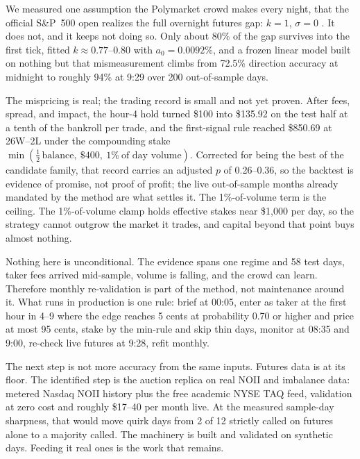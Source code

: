 \label{sec:conclusion}

We measured one assumption the Polymarket crowd makes every night, that the
official S\&P~500 open realizes the full overnight futures gap:
$k = 1$, $\sigma = 0$ \citep{polymarket2026spxmarket}. It does not, and
it keeps not doing so. Only about 80\% of the gap survives into the first
tick, fitted $k \approx 0.77$--$0.80$ with $a_0 = 0.0092\%$, and a frozen
linear model built on nothing but that mismeasurement climbs from 72.5\%
direction accuracy at midnight to roughly 94\% at 9:29 over 200
out-of-sample days.

The mispricing is real; the trading record is small and not yet proven.
After fees, spread, and impact, the
hour-4 hold turned \$100 into \$135.92 on the test half at a tenth of the
bankroll per trade, and the first-signal rule reached \$850.69 at 26W--2L
under the compounding stake $\min(\tfrac{1}{2}\,\text{balance},\ \$400,\
1\%\ \text{of day volume})$. Corrected for being the best of the candidate
family, that record carries an adjusted $p$ of 0.26--0.36, so the backtest
is evidence of promise, not proof of profit; the live out-of-sample months
already mandated by the method are what settles it. The
1\%-of-volume term is the ceiling. The
1\%-of-volume clamp holds effective stakes near \$1{,}000 per day, so the
strategy cannot outgrow the market it trades, and capital beyond that point
buys almost nothing.

Nothing here is unconditional. The evidence spans one regime and 58 test
days, taker fees arrived mid-sample, volume is falling, and the crowd can
learn. Therefore monthly re-validation is part of the method, not
maintenance around it. What runs in production is one rule: brief at 00:05,
enter as taker at the first hour in 4--9 where the edge reaches 5 cents at
probability 0.70 or higher and price at most 95 cents, stake by the
min-rule and skip thin days, monitor at 08:35 and 9:00, re-check live
futures at 9:28, refit monthly.

The next step is not more accuracy from the same inputs. Futures data is at
its floor. The identified step is the auction replica on real NOII and
imbalance data: metered Nasdaq NOII history plus the free academic NYSE
TAQ feed, validation at zero cost and roughly \$17--40 per month live.
At the measured sample-day sharpness, that would move quirk days from 2
of 12 strictly called on futures alone to a majority called. The machinery
is built and validated on synthetic days. Feeding it real ones is the work
that remains.
